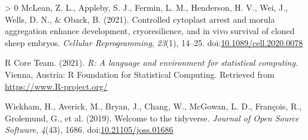\documentclass[10pt,a4paper,onecolumn]{article}
\newlength{\cslhangindent}
\newenvironment{CSLReferences}[3] %
 {%
  \setlength{\parindent}{0pt}
  \ifodd #1 \everypar{\setlength{\hangindent}{\cslhangindent}}\ignorespaces\fi
  \ifnum #2 > 0
  \setlength{\parskip}{#2\baselineskip}
  \fi
 }%
 {}
\begin{document}
\begin{CSLReferences}{1}{0}
\leavevmode\hypertarget{ref-mclean2021controlled}{}%
McLean, Z. L., Appleby, S. J., Fermin, L. M., Henderson, H. V., Wei, J.,
Wells, D. N., \& Oback, B. (2021). Controlled cytoplast arrest and
morula aggregation enhance development, cryoresilience, and in vivo
survival of cloned sheep embryos. \emph{Cellular Reprogramming},
\emph{23}(1), 14--25.
doi:\href{https://doi.org/10.1089/cell.2020.0078}{10.1089/cell.2020.0078}

\leavevmode\hypertarget{ref-CRAN}{}%
R Core Team. (2021). \emph{R: A language and environment for statistical
computing}. Vienna, Austria: R Foundation for Statistical Computing.
Retrieved from \url{https://www.R-project.org/}

\leavevmode\hypertarget{ref-wickham2019welcome}{}%
Wickham, H., Averick, M., Bryan, J., Chang, W., McGowan, L. D.,
François, R., Grolemund, G., et al. (2019). Welcome to the tidyverse.
\emph{Journal of Open Source Software}, \emph{4}(43), 1686.
doi:\href{https://doi.org/10.21105/joss.01686}{10.21105/joss.01686}

\end{CSLReferences}
\end{document}

